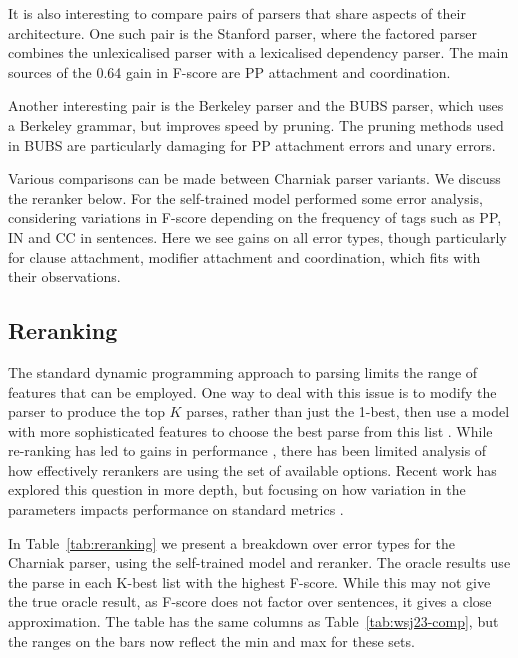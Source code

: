 It is also interesting to compare pairs of parsers that share aspects of their
architecture.  One such pair is the Stanford parser, where the factored parser
combines the unlexicalised parser with a lexicalised dependency parser.  The
main sources of the 0.64 gain in F-score are PP attachment and coordination.

Another interesting pair is the Berkeley parser and the BUBS parser, which uses
a Berkeley grammar, but improves speed by pruning.  The pruning methods used in
BUBS are particularly damaging for PP attachment errors and unary errors.

Various comparisons can be made between Charniak parser variants.  We discuss
the reranker below.  For the self-trained model
\textcite{McClosky-Charniak-Johnson:2006} performed some error analysis,
considering variations in F-score depending on the frequency of tags such as
PP, IN and CC in sentences.  Here we see gains on all error types, though
particularly for clause attachment, modifier attachment and coordination, which
fits with their observations.

\subsection{Reranking}

The standard dynamic programming approach to parsing limits the range of
features that can be employed.  One way to deal with this issue is to modify
the parser to produce the top $K$ parses, rather than just the 1-best, then use
a model with more sophisticated features to choose the best parse from this
list \parencite{collins:00}.  While re-ranking has led to gains in performance
\parencite{Charniak-Johnson:2005}, there has been limited analysis of how
effectively rerankers are using the set of available options.  Recent work has
explored this question in more depth, but focusing on how variation in the
parameters impacts performance on standard metrics
\parencite{huang:08a,Ng-etal:2010,Auli-Lopez:2011,Ng-Curran:2012}.

In Table~\ref{tab:reranking} we present a breakdown over error types for the
Charniak parser, using the self-trained model and reranker.  The oracle results
use the parse in each K-best list with the highest F-score.  While this may not
give the true oracle result, as F-score does not factor over sentences, it
gives a close approximation.  The table has the same columns as
Table~\ref{tab:wsj23-comp}, but the ranges on the bars now reflect the min and
max for these sets.

